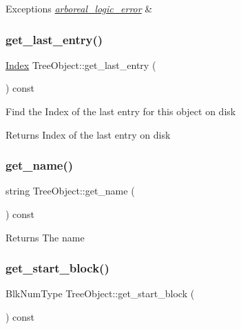 \begin{DoxyExceptions}{Exceptions}
{\em \mbox{\hyperlink{classarboreal__logic__error}{arboreal\+\_\+logic\+\_\+error}}} & \\
\hline
\end{DoxyExceptions}
\mbox{\label{classTreeObject_a2d7c1a4c2d36c81110ccae09d9724125}} 
\subsubsection{\texorpdfstring{get\+\_\+last\+\_\+entry()}{get\_last\_entry()}}
{\footnotesize\ttfamily \mbox{\hyperlink{structindex}{Index}} Tree\+Object\+::get\+\_\+last\+\_\+entry (\begin{DoxyParamCaption}{ }\end{DoxyParamCaption}) const}

Find the Index of the last entry for this object on disk \begin{DoxyReturn}{Returns}
Index of the last entry on disk 
\end{DoxyReturn}
\mbox{\label{classTreeObject_a5216922ec0b98bcc375601db8d253770}} 
\subsubsection{\texorpdfstring{get\+\_\+name()}{get\_name()}}
{\footnotesize\ttfamily string Tree\+Object\+::get\+\_\+name (\begin{DoxyParamCaption}{ }\end{DoxyParamCaption}) const}

\begin{DoxyReturn}{Returns}
The name 
\end{DoxyReturn}
\mbox{\label{classTreeObject_a16153734dbee4adc99fa195715728c2f}} 
\subsubsection{\texorpdfstring{get\+\_\+start\+\_\+block()}{get\_start\_block()}}
{\footnotesize\ttfamily Blk\+Num\+Type Tree\+Object\+::get\+\_\+start\+\_\+block (\begin{DoxyParamCaption}{ }\end{DoxyParamCaption}) const}

